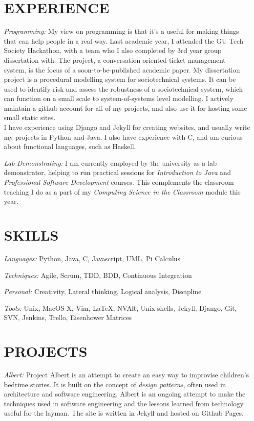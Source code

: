 \documentclass[margin, 10pt]{res}
\begin{document}
\begin{resume}
\section{EXPERIENCE}

{\sl Programming:} My view on programming is that it's a useful for making things that can help people in a real way. Last academic year, I attended the GU Tech Society Hackathon, with a team who I also completed by 3rd year group dissertation with. The project, a conversation-oriented ticket management system, is the focus of a soon-to-be-published academic paper. My dissertation project is a procedural modelling system for sociotechnical systems. It can be used to identify risk and assess the robustness of a sociotechnical system, which can function on a small scale to system-of-systems level modelling. I actively maintain a github account for all of my projects, and also use it for hosting some small static sites.\\
I have experience using Django and Jekyll for creating websites, and usually write my projects in Python and Java. I also have experience with C, and am curious about functional languages, such as Haskell. \par
{\sl Lab Demonstrating:} I am currently employed by the university as a lab demonstrator, helping to run practical sessions for \emph{Introduction to Java} and \emph{Professional Software Development} courses. This complements the classroom teaching I do as a part of my \emph{Computing Science in the Classroom} module this year.


\section{SKILLS}

{\sl Languages:} Python, Java, C, Javascript, UML, Pi Calculus \par
{\sl Techniques:} Agile, Scrum, TDD, BDD, Continuous Integration \par 
{\sl Personal:} Creativity, Lateral thinking, Logical analysis, Discipline \par
{\sl Tools:} Unix, MacOS X, Vim, LaTeX, NVAlt, Unix shells, Jekyll, Django, Git, SVN, Jenkins, Trello, Eisenhower Matrices

\section{PROJECTS}

{\sl Albert:} Project Albert is an attempt to create an easy way to improvise children's bedtime stories. It is built on the concept of \emph{design patterns}, often used in architecture and software engineering. Albert is an ongoing attempt to make the techniques used in software engineering and the lessons learned from technology useful for the layman. The site is written in Jekyll and hosted on Github Pages.


\end{resume}
\end{document}

